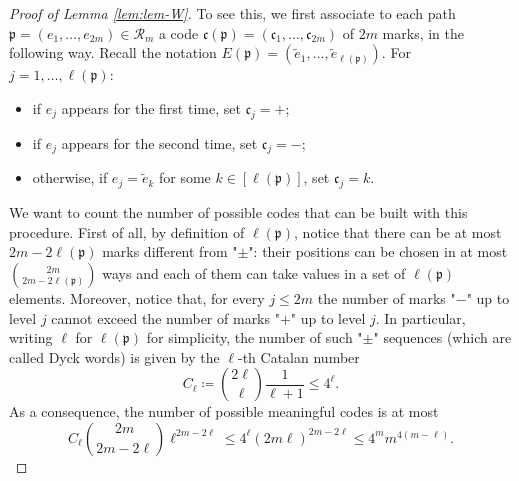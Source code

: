 \documentclass[11pt,oneside]{amsart}
\theoremstyle{plain}
\numberwithin{equation}{section}
\newcommand{\pat}{\mathfrak{p}}
\begin{document}
\begin{proof}[Proof of Lemma \ref{lem:lem-W}]
To see this, we first associate to each path $\pat=(e_1,\dots,e_{2m}) \in \mathcal{R}_m$ a code $\mathfrak{c}(\pat)=(\mathfrak{c}_1,\dots,\mathfrak{c}_{2m})$ of $2m$ {marks}, in the following way.  Recall the notation $E(\pat)=(\tilde e_1,\dots, \tilde e_{{\ell(\pat)}})$. For $j =1,\dots,\ell(\pat)$:
\begin{itemize}
    \item if $e_j$ appears for the first time, set $\mathfrak{c}_j=+$;
    \item if $e_j$ appears for the second time, set $\mathfrak{c}_j=-$;
    \item otherwise, if $e_j=\tilde e_{k}$ for some $k \in [{\ell(\pat)}]$, set $\mathfrak{c}_j=k$.
\end{itemize}
We want to count the number of possible codes that can be built with this procedure.
First of all, by definition of ${\ell(\pat)}$, notice that there can be at most $2m-2{\ell(\pat)}$ marks different from "$\pm$": their positions can be chosen in at most $\binom{2m}{2m-2{\ell(\pat)}}$ ways and each of them can take values in a set of ${\ell(\pat)}$ elements.
Moreover, notice that, for every $j \le 2m$ the number of marks "$-$" up to level $j$ cannot exceed the number of marks "$+$" up to level $j$. 
In particular, writing $\ell$ for $\ell(\pat)$ for simplicity, the number of such "$\pm$" sequences (which are called Dyck words) is given by the ${{\ell}}$-th Catalan number
\begin{equation}
    C_{{\ell}}\coloneq \binom{2{{\ell}}}{{{\ell}}} \frac{1}{{{\ell}}+1} \le 4^{{{\ell}}}.
\end{equation}
As a consequence, the number of possible meaningful codes is at most
\begin{equation}
    C_{{\ell}} \binom{2m}{2m-2{{\ell}}} {{\ell}}^{2m-2{{\ell}}} \le 4^{{\ell}} (2m{{\ell}})^{2m-2{{\ell}}} \le 4^m m^{4(m-{{\ell}})}.
\end{equation}


\end{proof}
\end{document}
